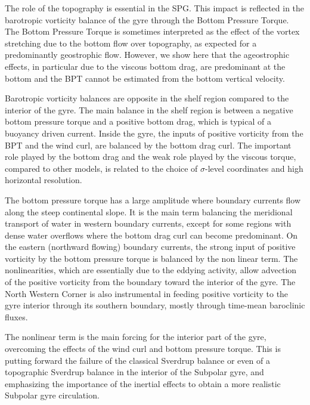 \documentclass[os, manuscript]{copernicus}
\begin{document}
The role of the topography is essential in the SPG. This impact is reflected in the barotropic vorticity balance of the gyre through the Bottom Pressure Torque. The Bottom Pressure Torque is sometimes interpreted as the effect of the vortex stretching due to the bottom flow over topography, as expected for a predominantly geostrophic flow. However, we show here that the ageostrophic effects, in particular due to the viscous bottom drag, are predominant at the bottom and the BPT cannot be estimated from the bottom vertical velocity. 

Barotropic vorticity balances are opposite in the shelf region compared to the interior of the gyre. The main balance in the shelf region is between a negative bottom pressure torque and a positive bottom drag, which is typical of a buoyancy driven current. Inside the gyre, the inputs of positive vorticity from the BPT and the wind curl, are balanced by the bottom drag curl. The important role played by the bottom drag and the weak role played by the viscous torque, compared to other models, is related to the choice of $\sigma$-level coordinates and high horizontal resolution. 

The bottom pressure torque has a large amplitude where boundary currents flow along the steep continental slope. It is the main term  balancing the meridional transport of water in western  boundary currents, except for some regions with dense water overflows where the bottom drag curl can become predominant. On the eastern (northward flowing) boundary currents, the strong input of positive vorticity by the bottom pressure torque is balanced by  the non linear term. The nonlinearities, which are essentially due to the eddying activity, allow advection of the positive vorticity from the boundary toward the interior of the gyre. The North Western Corner is also instrumental in feeding positive vorticity to the gyre interior through its southern boundary, mostly through time-mean baroclinic fluxes.

The nonlinear term is the main forcing for the interior part of the gyre, overcoming the effects of the wind curl and bottom pressure torque. This is putting forward the failure of the classical Sverdrup balance or even of a topographic Sverdrup balance in the interior of the Subpolar gyre, and emphasizing the importance of the inertial effects to obtain a more realistic Subpolar gyre circulation.


\end{document}
